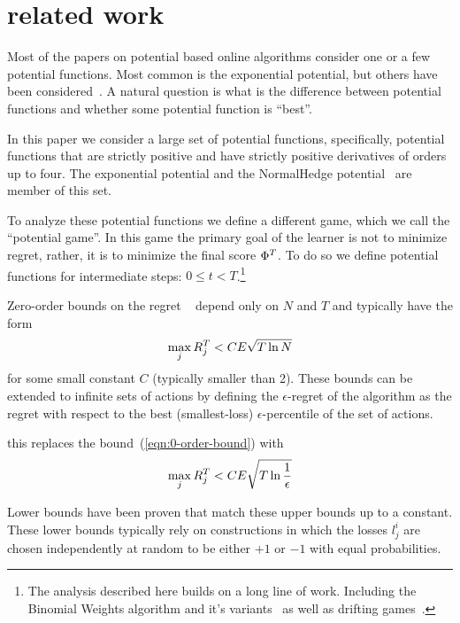 \documentclass{article}[12pt]
\begin{document}
\section{related work}
Most of the papers on potential based online algorithms consider
one or a few potential functions. Most common is the exponential
potential, but others have been considered~\cite{cesa2006prediction}.
A natural question is what is the difference between potential
functions and whether some potential function is ``best''.

In this paper we consider a large set of potential functions,
specifically, potential functions that are strictly positive and have
strictly positive derivatives of orders up to four. The exponential
potential and the NormalHedge potential~\cite{chaudhuri2009parameter,luo2015achieving}
are member of this set. 

To analyze these potential functions we define a different
game, which we call the ``potential game''. In this game the primary
goal of the learner is not to minimize regret, rather, it is to
minimize the final score $\Phi^T$. To do so
we define potential functions for intermediate steps: $0 \leq t
<T$.\footnote{The analysis described here builds on a long line of
  work. Including the Binomial Weights algorithm and it's
  variants~\cite{cesa1996line,abernethy2006continuous,abernethy2008optimal}
  as well as drifting games~\cite{schapire2001drifting,freund2002drifting}.}

Zero-order bounds on the regret ~\cite{freund1999adaptive} depend only on $N$
and $T$ and typically have the form
\begin{equation} \label{eqn:0-order-bound}
  \max_j R_j^T < C E \sqrt{T \ln N}
\end{equation}
for some small constant $C$ (typically smaller than 2).
These bounds can be extended to infinite sets of actions by defining
the $\epsilon$-regret of the algorithm as the regret with respect to
the best (smallest-loss) $\epsilon$-percentile of the set of actions.

this replaces the bound~(\ref{eqn:0-order-bound}) with 
\begin{equation} \label{eqn:0-epsilon-order-bound}
  \max_j R_j^T < C E \sqrt{T \ln \frac{1}{\epsilon}}
\end{equation}

Lower bounds have been proven that match these upper bounds up to a
constant. These lower bounds typically rely on constructions in which
the losses $l_j^i$ are chosen independently at random to be either
$+1$ or $-1$ with equal probabilities.
\end{document}
